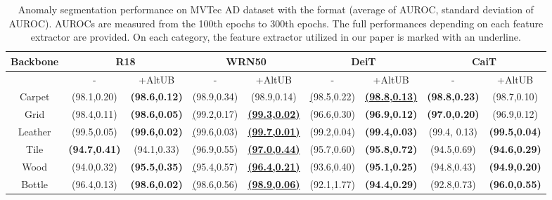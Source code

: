 \documentclass[letterpaper]{article}
\begin{document}
\begin{table*}[t]

\caption{Anomaly segmentation performance on MVTec AD dataset with the format  (average of AUROC, standard deviation of AUROC). AUROCs are measured from the 100th epochs to 300th epochs. The full performances depending on each feature extractor are provided. On each category, the feature extractor utilized in our paper is marked with an underline.}
\label{table-fastfow-full}
\centering

\begin{tabular}{c|cc|cc|cc|cc}
\hline
Backbone   & \multicolumn{2}{c|}{R18}                    & \multicolumn{2}{c|}{WRN50}                        & \multicolumn{2}{c|}{DeiT}                         & \multicolumn{2}{c}{CaiT}                          \\ \hline
           & -                    & +AltUB               & -                    & +AltUB                     & -                    & +AltUB                     & -                    & +AltUB                     \\ \hline
Carpet     & (98.1,0.20)          & \textbf{(98.6,0.12)} & (98.9,0.34)          & (98.9,0.14)                & {\ul (98.5,0.22)}    & {\ul \textbf{(98.8,0.13)}} & \textbf{(98.8,0.23)} & (98.7,0.10)                \\
Grid       & (98.4,0.11)          & \textbf{(98.6,0.05)} & {\ul (99.2,0.17)}    & {\ul \textbf{(99.3,0.02)}} & (96.6,0.30)          & \textbf{(96.9,0.12)}       & \textbf{(97.0,0.20)}          & (96.9,0.12)                \\
Leather    & (99.5,0.05)          & \textbf{(99.6,0.02)} & {\ul (99.6,0.03)}    & {\ul \textbf{(99.7,0.01)}} & (99.2,0.04)          & \textbf{(99.4,0.03)}       & (99.4, 0.13)         & \textbf{(99.5,0.04)}       \\
Tile       & \textbf{(94.7,0.41)} & (94.1,0.33)          & {\ul (96.9,0.55)}    & {\ul \textbf{(97.0,0.44)}} & (95.7,0.60)          & \textbf{(95.8,0.72)}       & (94.5,0.69)          & \textbf{(94.6,0.29)}                \\
Wood       & (94.0,0.32)          & \textbf{(95.5,0.35)} & {\ul (95.4,0.57)}    & {\ul \textbf{(96.4,0.21)}} & (93.6,0.40)          & \textbf{(95.1,0.25)}       & (94.8,0.43)          & \textbf{(94.9,0.20)}       \\
Bottle     & (96.4,0.13)          & \textbf{(98.6,0.02)} & {\ul (98.6,0.56)}    & {\ul \textbf{(98.9,0.06)}} & (92.1,1.77)          & \textbf{(94.4,0.29)}       & (92.8,0.73)          & \textbf{(96.0,0.55)}       \\

\end{tabular}
\end{table*}
\end{document}
